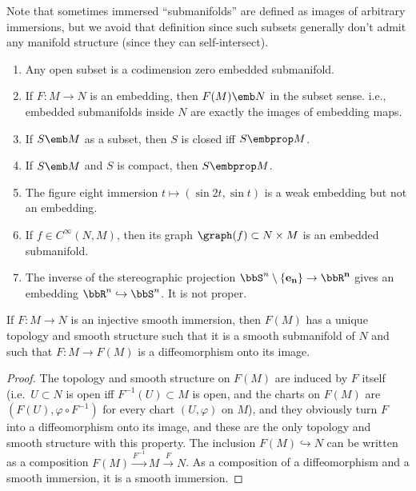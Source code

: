 Note that sometimes immersed ``submanifolds'' are defined as images of arbitrary immersions, but we avoid that definition since such subsets generally don't admit any manifold structure (since they can self-intersect).

\begin{example}\label{example submanifolds}
\begin{enumerate}
    \item Any open subset is a codimension zero embedded submanifold.
    \item If $F:M\to N$ is an embedding, then $F(M)\emb N$ in the subset sense. i.e., embedded submanifolds inside $N$ are exactly the images of embedding maps.
    \item If $S\emb M$ as a subset, then $S$ is closed iff $S\embprop M$.
    \item If $S\emb M$ and $S$ is compact, then $S\embprop M$.
    \item  The figure eight immersion $t\mapsto (\sin 2t,\sin t)$ is a weak embedding but not an embedding.
    \item If $f\in C^\infty(N,M)$, then its graph $\graph(f)\subset N\times M$ is an embedded submanifold.
    \item The inverse of the stereographic projection $\bbS^n\setminus \{\bf{e}_n\}\to \bbR^n$ gives an embedding $\bbR^n\hookrightarrow \bbS^n$. It is not proper.
\end{enumerate}
\end{example}


\begin{prop}\label{prop 5.18 Lee}
    If $F:M\to N$ is an injective smooth immersion, then $F(M)$ has a unique topology and smooth structure such that it is a smooth submanifold of $N$ and such that $F:M\to F(M)$ is a diffeomorphism onto its image.
\end{prop}
\begin{proof}
    The topology and smooth structure on $F(M)$ are induced by $F$ itself (i.e.~$U\subset N$ is open iff $F^{-1}(U)\subset M$ is open, and the charts on $F(M)$ are $(F(U),\varphi\circ F^{-1})$ for every chart $(U,\varphi)$ on $M$), and they obviously turn $F$ into a diffeomorphism onto its image, and these are the only topology and smooth structure with this property. The inclusion $F(M)\hookrightarrow N$ can be written as a composition $F(M)\overset{F^{-1}}{\to}M\overset{F}{\to}N$. As a composition of a diffeomorphism and a smooth immersion, it is a smooth immersion.
\end{proof}


